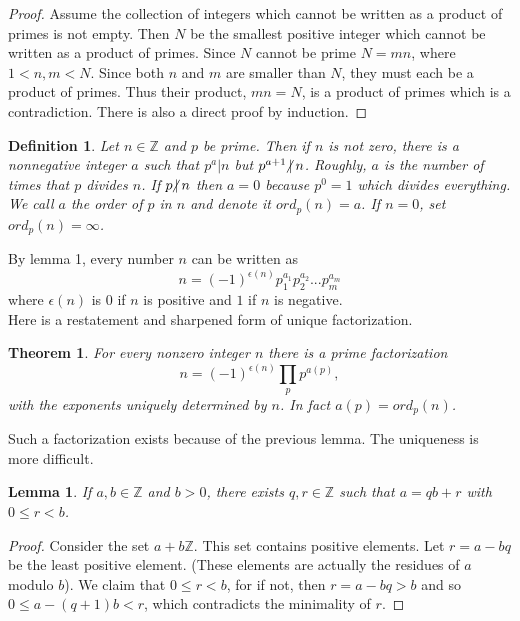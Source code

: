 \documentclass{article}
\theoremstyle{problemstyle}
\newtheorem{theorem}{Theorem}
\newtheorem{lemma}{Lemma}
\newtheorem{definition}{Definition}
\newcommand{\ndiv}{\hspace{-4pt}\not|\hspace{2pt}}
\begin{document}
\begin{proof}
Assume the collection of integers which cannot be written as a product of primes is not empty. Then $N$ be the smallest positive integer which cannot be written as a product of primes. Since $N$ cannot be prime $N = mn$, where $1<n,m<N$. Since both $n$ and $m$ are smaller than $N$, they must each be a product of primes. Thus their product, $mn = N$, is a product of primes which is a contradiction.  There is also a direct proof by induction. 
\end{proof}

\begin{definition}
Let $n \in \mathbb{Z}$ and $p$ be prime. Then if $n$ is not zero, there is a nonnegative integer $a$ such that $p^a|n$ but $p^{a+1}\ndiv n$. Roughly, $a$ is the number of times that $p$ divides $n$. If $p\ndiv n$ then $a = 0$ because $p^0 = 1$ which divides everything. We call $a$ the order of $p$ in $n$ and denote it $ord_p(n) = a$. If $n = 0$, set $ord_p(n) = \infty$. 
\end{definition}

By lemma 1, every number $n$ can be written as $$n = (-1)^{\epsilon(n)} p_1^{a_1}p_2^{a_2}...p_m^{a_m}$$ where $\epsilon(n)$ is $0$ if $n$ is positive and $1$ if $n$ is negative.\\

Here is a restatement and sharpened form of unique factorization. 

\begin{theorem}
For every nonzero integer $n$ there is a prime factorization 
\begin{equation*}n = (-1)^{\epsilon(n)}\prod_pp^{a(p)}, \end{equation*} 
with the exponents uniquely determined by $n$. In fact $a(p) = ord_p(n)$. 
\end{theorem}

Such a factorization exists because of the previous lemma. The uniqueness is more difficult. 

\begin{lemma}
If $a,b \in \mathbb{Z}$ and $b > 0$, there exists $q,r \in \mathbb{Z}$ such that $a = qb+r$ with $0 \leq r < b$. 
\end{lemma}

\begin{proof}
Consider the set $a+b\mathbb{Z}$. This set contains positive elements. Let $r = a - bq$ be the least positive element. (These elements are actually the residues of $a$ modulo $b$). We claim that $0 \leq r < b$, for if not, then $r = a-bq > b$ and so $0 \leq a-(q+1)b < r$, which contradicts the minimality of $r$. 
\end{proof}
\end{document}
